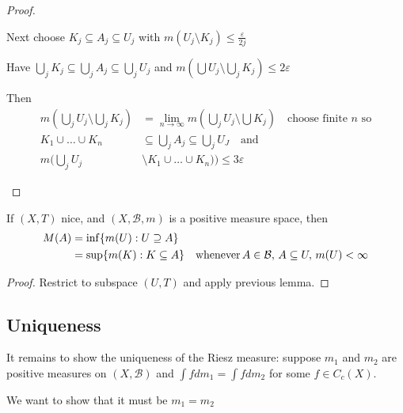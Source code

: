 \begin{proof}
\begin{enumerate}
	Next choose $K_j \subseteq A_j \subseteq U_j$ with  $m(U_j \setminus K_j) \leq \frac{\varepsilon}{2j}$

	Have $\bigcup_j K_j \subseteq \bigcup_j A_j \subseteq \bigcup_j U_j$ and  $m(\bigcup U_j \setminus \bigcup_j K_j ) \leq 2 \varepsilon$

	Then
	\begin{align*}
		m( \bigcup_{j} U_j \setminus \bigcup_j K_j) &= \lim_{n \to \infty} m ( \bigcup_j U_j \setminus \bigcup K_j) \quad \text{choose finite $n$ so} \\
		K_1 \cup \ldots \cup K_n &\subseteq \bigcup_j A_j \subseteq \bigcup_j U_J \quad \text{and} \\
		m(\bigcup_j U_j &\setminus K_1 \cup \ldots \cup K_n )) \leq 3\varepsilon
	\end{align*}
\end{enumerate}

\end{proof}

\begin{lemma}
	If $(X, T)$ nice, and $(X,\mathcal{B}, m)$ is a positive measure space, then
	\begin{align*}
		M(A) &= \inf\{m(U) : U \supseteq A\} \\
			 &= \sup \{m(K) : K \subseteq A \} \quad \text{whenever} \, A \in \mathcal{B},
			 \, A \subseteq U, \, m(U) < \infty
	\end{align*}
\end{lemma}

\begin{proof}
	Restrict to subspace $(U,T)$ and apply previous lemma.
\end{proof}

\subsection{Uniqueness}
It remains to show the uniqueness of the Riesz measure: suppose $m_1$ and $m_2$ are positive measures on $(X,\mathcal{B})$ and $\int f dm_1 = \int f dm_2$ for some  $f \in C_c(X)$.


We want to show that it must be  $m_1 = m_2$

